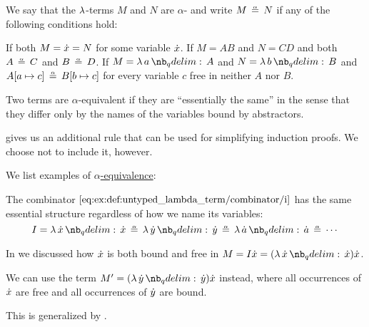 \begin{definition}\label{def:untyped_lambda_term_alpha_equivalence}\mimprovised
  We say that the \( \mathrm{\lambda} \)-terms \( M \) and \( N \) are \( \alpha \)- and write \( M \aequiv N \) if any of the following conditions hold:
  \begin{thmenum}
     If both \( M = {\dot{x}} = N \) for some variable \( {\dot{x}} \).
     If \( M = A B \) and \( N = C D \) and both \( A \aequiv C \) and \( B \aequiv D \).
     If \( M = \qabs a A \) and \( N = \qabs b B \) and \( A[a \mapsto c] \aequiv B[b \mapsto c] \) for every variable \( c \) free in neither \( A \) nor \( B \).
  \end{thmenum}
\end{definition}
\begin{comments}
  \item Two terms are \( \alpha \)-equivalent if they are \enquote{essentially the same} in the sense that they differ only by the names of the variables bound by abstractors.

  \item {} gives us an additional rule that can be used for simplifying induction proofs. We choose not to include it, however.
\end{comments}

\begin{example}\label{ex:def:untyped_lambda_term_alpha_equivalence}
  We list examples of \hyperref[def:untyped_lambda_term_alpha_equivalence]{\( \alpha \)-equivalence}:
  \begin{thmenum}
     The combinator \( \ref{eq:ex:def:untyped_lambda_term/combinator/i} \) has the same essential structure regardless of how we name its variables:
    \begin{equation*}
      I = \qabs \synx \synx \aequiv \qabs \syny \syny \aequiv \qabs {\syn a} \syn a \aequiv \cdots
    \end{equation*}

     In  we discussed how \( {\dot{x}} \) is both bound and free in \( M = I \synx = (\qabs \synx \synx) \synx \).

    We can use the term \( M' = (\qabs \syny \syny) \synx \) instead, where all occurrences of \( {\dot{x}} \) are free and all occurrences of \( {\dot{y}} \) are bound.

    This is generalized by .
  \end{thmenum}
\end{example}

